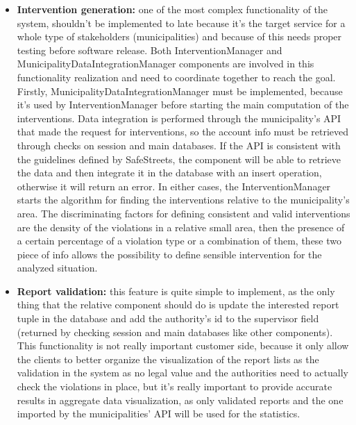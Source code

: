 \begin{itemize}
	\item \textbf{Intervention generation:} one of the most complex functionality of the system, shouldn't be implemented to late because it's the target service for a whole type of stakeholders (municipalities) and because of this needs proper testing before software release. Both InterventionManager and MunicipalityDataIntegrationManager components are involved in this functionality realization and need to coordinate together to reach the goal. Firstly, MunicipalityDataIntegrationManager must be implemented, because it's used by InterventionManager before starting the main computation of the interventions. Data integration is performed through the municipality's API that made the request for interventions, so the account info must be retrieved through checks on session and main databases. If the API is consistent with the guidelines defined by SafeStreets, the component will be able to retrieve the data and then integrate it in the database with an insert operation, otherwise it will return an error. In either cases, the InterventionManager starts the algorithm for finding the interventions relative to the municipality's area. The discriminating factors for defining consistent and valid interventions are the density of the violations in a relative small area, then the presence of a certain percentage of a violation type or a combination of them, these two piece of info allows the possibility to define sensible intervention for the analyzed situation.
	\item \textbf{Report validation:} this feature is quite simple to implement, as the only thing that the relative component should do is update the interested report tuple in the database and add the authority's id to the supervisor field (returned by checking session and main databases like other components). This functionality is not really important customer side, because it only allow the clients to better organize the visualization of the report lists as the validation in the system as no legal value and the authorities need to actually check the violations in place, but it's really important to provide accurate results in aggregate data visualization, as only validated reports and the one imported by the municipalities' API will be used for the statistics.

\end{itemize}

